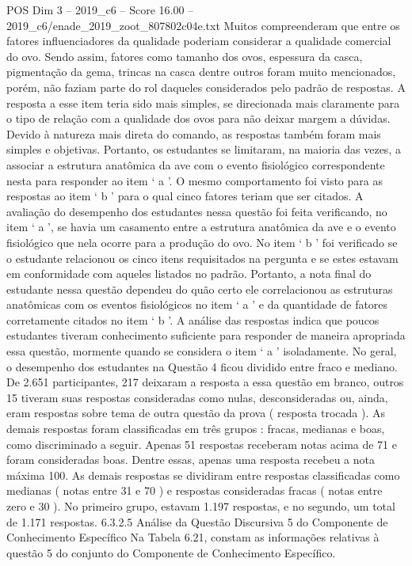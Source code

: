 \begin{textsample}{POS Dim 3 – 2019\_c6 – Score 16.00 – 2019\_c6/enade\_2019\_zoot\_807802c04e.txt}
Muitos compreenderam que entre os fatores influenciadores da qualidade poderiam considerar a qualidade comercial do ovo.
Sendo assim, fatores como tamanho dos ovos, espessura da casca, pigmentação da gema, trincas na casca dentre outros foram muito mencionados, porém, não faziam parte do rol daqueles considerados pelo padrão de respostas.
A resposta a esse item teria sido mais simples, se direcionada mais claramente para o tipo de relação com a qualidade dos ovos para não deixar margem a dúvidas.
Devido à natureza mais direta do comando, as respostas também foram mais simples e objetivas.
Portanto, os estudantes se limitaram, na maioria das vezes, a associar a estrutura anatômica da ave com o evento fisiológico correspondente nesta para responder ao item ‘ a ’.
O mesmo comportamento foi visto para as respostas ao item ‘ b ’ para o qual cinco fatores teriam que ser citados.
A avaliação do desempenho dos estudantes nessa questão foi feita verificando, no item ‘ a ’, se havia um casamento entre a estrutura anatômica da ave e o evento fisiológico que nela ocorre para a produção do ovo.
No item ‘ b ’ foi verificado se o estudante relacionou os cinco itens requisitados na pergunta e se estes estavam em conformidade com aqueles listados no padrão.
Portanto, a nota final do estudante nessa questão dependeu do quão certo ele correlacionou as estruturas anatômicas com os eventos fisiológicos no item ‘ a ’ e da quantidade de fatores corretamente citados no item ‘ b ’.
A análise das respostas indica que poucos estudantes tiveram conhecimento suficiente para responder de maneira apropriada essa questão, mormente quando se considera o item ‘ a ’ isoladamente.
No geral, o desempenho dos estudantes na Questão 4 ficou dividido entre fraco e mediano.
De 2.651 participantes, 217 deixaram a resposta a essa questão em branco, outros 15 tiveram suas respostas consideradas como nulas, desconsideradas ou, ainda, eram respostas sobre tema de outra questão da prova ( resposta trocada ).
As demais respostas foram classificadas em três grupos : fracas, medianas e boas, como discriminado a seguir.
Apenas 51 respostas receberam notas acima de 71 e foram consideradas boas.
Dentre essas, apenas uma resposta recebeu a nota máxima 100.
As demais respostas se dividiram entre respostas classificadas como medianas ( notas entre 31 e 70 ) e respostas consideradas fracas ( notas entre zero e 30 ).
No primeiro grupo, estavam 1.197 respostas, e no segundo, um total de 1.171 respostas. 6.3.2.5 Análise da Questão Discursiva 5 do Componente de Conhecimento Específico Na Tabela 6.21, constam as informações relativas à questão 5 do conjunto do Componente de Conhecimento Específico.

\end{textsample}

